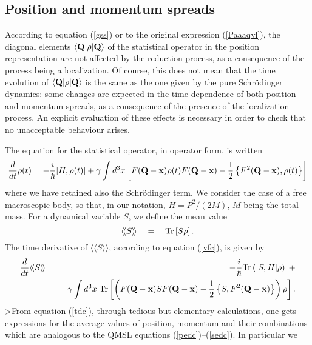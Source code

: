 \documentclass[12pt]{article}
\newcommand{\llangle}{\langle\!\langle}
\newcommand{\rrangle}{\rangle\!\rangle}
\begin{document}
\subsection{Position and momentum spreads} \label{sec74}

According to equation (\ref{gss}) or to the original expression
(\ref{Paaaqvl}), the diagonal elements $\langle {\bf Q}| \rho
|{\bf Q} \rangle$ of the statistical operator in the position
representation are not affected by the reduction process, as a
consequence of the process being a localization. Of course, this
does not mean that the time evolution of $\langle {\bf Q}| \rho
|{\bf Q} \rangle$ is the same as the one given by the pure
Schr\"odinger dynamics: some changes are expected in the time
dependence of both position and momentum spreads, as a consequence
of the presence of the localization process. An explicit
evaluation of these effects is necessary in order to check that no
unacceptable behaviour arises.
\par The equation for the statistical operator, in operator form,
is written
\begin{equation} \label{vfc}
\frac{d}{dt} \rho(t) =  - \frac{i}{\hbar} [H, \rho(t)] + \gamma
\int d^3 x \left[ F({\bf Q} - {\bf x}) \rho(t) F({\bf Q} - {\bf
x}) - \frac{1}{2} \left\{ F^2({\bf Q} - {\bf x}), \rho(t) \right\}
\right]
\end{equation}
where we have retained also the Schr\"odinger term. We consider the case
of a free macroscopic body, so that, in our notation, $H = P^2 /
(2M)$, $M$ being the total mass. For a dynamical variable $S$, we
define the mean value
\begin{equation}
\llangle S \rrangle \quad = \quad \makebox{Tr} \left[ S \rho
\right].
\end{equation}
The time derivative of $\llangle S \rrangle$, according to
equation (\ref{vfc}), is given by
\begin{eqnarray} \label{tdc}
\frac{d}{dt} \llangle S \rrangle & = &  -\frac{i}{\hbar}
\makebox{Tr} \left( [S,H] \rho \right) \; + \\
& & \;\; \gamma \int d^3 x \;\makebox{Tr} \left[ \left( F({\bf Q}
- {\bf x}) S F({\bf Q} - {\bf x}) - \frac{1}{2} \left\{ S,
F^2({\bf Q} - {\bf x}) \right\} \right) \rho \right]. \nonumber
\end{eqnarray}
>From equation (\ref{tdc}), through tedious but elementary
calculations, one gets expressions for the average values of
position, momentum and their combinations which are analogous to
the QMSL equations (\ref{pedc})--(\ref{sedc}). In particular we
\end{document}
